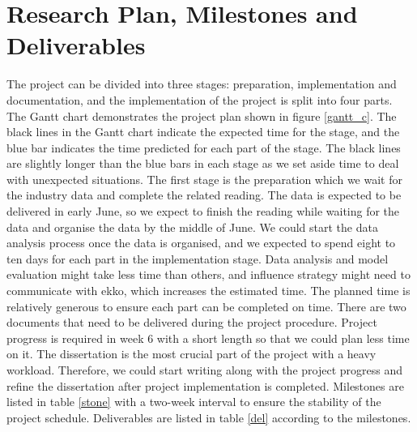 \documentclass[a4paper,11pt]{article}
\begin{document}
\section{Research Plan, Milestones and Deliverables}

The project can be divided into three stages: preparation, implementation and documentation, and the implementation of the project is split into four parts. The Gantt chart demonstrates the project plan shown in figure \ref{gantt_c}.
The black lines in the Gantt chart indicate the expected time for the stage, and the blue bar indicates the time predicted for each part of the stage.
The black lines are slightly longer than the blue bars in each stage as we set aside time to deal with unexpected situations.
The first stage is the preparation which we wait for the industry data and complete the related reading. The data is expected to be delivered in early June, so we expect to finish the reading while waiting for the data and organise the data by the middle of June. 
We could start the data analysis process once the data is organised, and we expected to spend eight to ten days for each part in the implementation stage. Data analysis and model evaluation might take less time than others, and influence strategy might need to communicate with ekko, which increases the estimated time. The planned time is relatively generous to ensure each part can be completed on time.
There are two documents that need to be delivered during the project procedure. Project progress is required in week 6 with a short length so that we could plan less time on it. The dissertation is the most crucial part of the project with a heavy workload. Therefore, we could start writing along with the project progress and refine the dissertation after project implementation is completed.
Milestones are listed in table \ref{stone} with a two-week interval to ensure the stability of the project schedule. Deliverables are listed in table \ref{del} according to the milestones.

\end{document}
